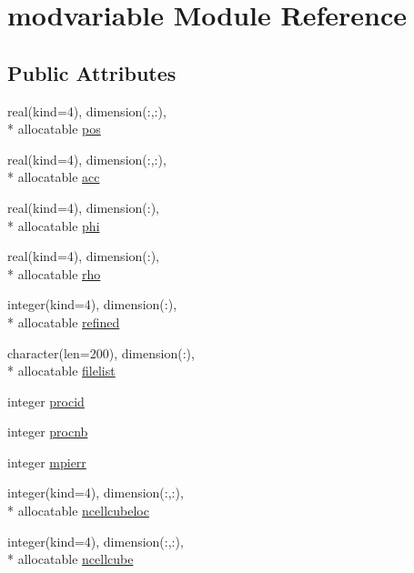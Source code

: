 \hypertarget{classmodvariable}{\section{modvariable Module Reference}
\label{classmodvariable}
}
\subsection*{Public Attributes}
\begin{DoxyCompactItemize}
\item 
real(kind=4), dimension(\-:,\-:), \\*
allocatable \hyperlink{classmodvariable_a280e598b1db785bf34f0165ecd7b6985}{pos}
\item 
real(kind=4), dimension(\-:,\-:), \\*
allocatable \hyperlink{classmodvariable_a3d403cfbb8c3f6373447b1e6647d7aa7}{acc}
\item 
real(kind=4), dimension(\-:), \\*
allocatable \hyperlink{classmodvariable_a00db7c06432451702db34fda71ed1cd1}{phi}
\item 
real(kind=4), dimension(\-:), \\*
allocatable \hyperlink{classmodvariable_a29eaedbfcc5873ff326af3c93e5558c6}{rho}
\item 
integer(kind=4), dimension(\-:), \\*
allocatable \hyperlink{classmodvariable_a8de6519433943eabe03c631fdab15e67}{refined}
\item 
character(len=200), dimension(\-:), \\*
allocatable \hyperlink{classmodvariable_a73053f430f8e14a8f6c91851e02ca4c0}{filelist}
\item 
integer \hyperlink{classmodvariable_af640fc287249ccc7e43133f74d704cf5}{procid}
\item 
integer \hyperlink{classmodvariable_a77ab6ce14a18f48d9c5f3ccd1f1cf044}{procnb}
\item 
integer \hyperlink{classmodvariable_a85886f33027f4edc9331bd9ada689d22}{mpierr}
\item 
integer(kind=4), dimension(\-:,\-:), \\*
allocatable \hyperlink{classmodvariable_ac90972e5c9f0aa13073f9f1f6f9cf879}{ncellcubeloc}
\item 
integer(kind=4), dimension(\-:,\-:), \\*
allocatable \hyperlink{classmodvariable_a8bc6342027666b4dec0f7f417c754b55}{ncellcube}
\item 

\end{DoxyCompactItemize}
